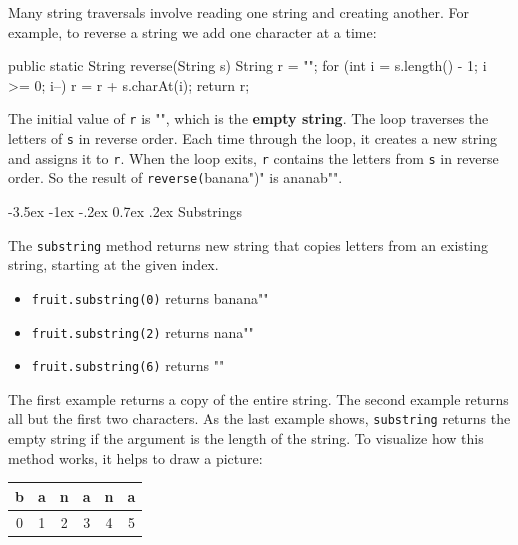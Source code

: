 \documentclass[12pt]{book}
\makeatletter
\theoremstyle{exercise}
\newcommand{\java}[1]{\verb"#1"}
\renewcommand{\section}{\@startsection{section}{1}{\z@}%
    {-3.5ex \@plus -1ex \@minus -.2ex}%
    {0.7ex \@plus.2ex}%
    {\normalfont\Large\bfseries}}
\newcommand{\java}[1]{\lstinline{#1}} %
\makeatother
\begin{document}
Many string traversals involve reading one string and creating another.
For example, to reverse a string we add one character at a time:

\begin{code}
    public static String reverse(String s) {
        String r = "";
        for (int i = s.length() - 1; i >= 0; i--) {
            r = r + s.charAt(i);
        }
        return r;
    }
\end{code}


The initial value of \java{r} is \java{""}, which is the {\bf empty string}.
The loop traverses the letters of \java{s} in reverse order.
Each time through the loop, it creates a new string and assigns it to \java{r}.
When the loop exits, \java{r} contains the letters from \java{s} in reverse order.
So the result of \java{reverse("banana")} is \java{"ananab"}.


\section{Substrings}

The \java{substring} method returns new string that copies letters from an existing string, starting at the given index.

\begin{itemize}
\item \java{fruit.substring(0)} returns \java{"banana"}
\item \java{fruit.substring(2)} returns \java{"nana"}
\item \java{fruit.substring(6)} returns \java{""}
\end{itemize}

The first example returns a copy of the entire string.
The second example returns all but the first two characters.
As the last example shows, \java{substring} returns the empty string if the argument is the length of the string.
To visualize how this method works, it helps to draw a picture:


\begin{center}
\begin{tabular}{|c|c|c|c|c|c|}
\hline
b & a & n & a & n & a \\
\hline
0 & 1 & 2 & 3 & 4 & 5 \\
\hline
\end{tabular}
\end{center}
\end{document}
